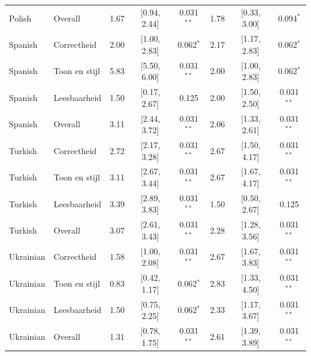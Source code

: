 \begin{table}[htbp]
\begin{tabular}{@{}l l c c c c c c@{}}
Polish & Overall & 1.67 & [0.94, 2.44] & 0.031$^{**}$ & 1.78 & [0.33, 3.00] & 0.094$^{*}$ \\
Spanish & Correctheid & 2.00 & [1.00, 2.83] & 0.062$^{*}$ & 2.17 & [1.17, 2.83] & 0.062$^{*}$ \\
Spanish & Toon en stijl & 5.83 & [5.50, 6.00] & 0.031$^{**}$ & 2.00 & [1.00, 2.83] & 0.062$^{*}$ \\
Spanish & Leesbaarheid & 1.50 & [0.17, 2.67] & 0.125 & 2.00 & [1.50, 2.50] & 0.031$^{**}$ \\
Spanish & Overall & 3.11 & [2.44, 3.72] & 0.031$^{**}$ & 2.06 & [1.33, 2.61] & 0.031$^{**}$ \\
Turkish & Correctheid & 2.72 & [2.17, 3.28] & 0.031$^{**}$ & 2.67 & [1.50, 4.17] & 0.031$^{**}$ \\
Turkish & Toon en stijl & 3.11 & [2.67, 3.44] & 0.031$^{**}$ & 2.67 & [1.67, 4.17] & 0.031$^{**}$ \\
Turkish & Leesbaarheid & 3.39 & [2.89, 3.83] & 0.031$^{**}$ & 1.50 & [0.50, 2.67] & 0.125 \\
Turkish & Overall & 3.07 & [2.61, 3.43] & 0.031$^{**}$ & 2.28 & [1.28, 3.56] & 0.031$^{**}$ \\
Ukrainian & Correctheid & 1.58 & [1.00, 2.08] & 0.031$^{**}$ & 2.67 & [1.67, 3.83] & 0.031$^{**}$ \\
Ukrainian & Toon en stijl & 0.83 & [0.42, 1.17] & 0.062$^{*}$ & 2.83 & [1.33, 4.50] & 0.031$^{**}$ \\
Ukrainian & Leesbaarheid & 1.50 & [0.75, 2.25] & 0.062$^{*}$ & 2.33 & [1.17, 3.67] & 0.031$^{**}$ \\
Ukrainian & Overall & 1.31 & [0.78, 1.75] & 0.031$^{**}$ & 2.61 & [1.39, 3.89] & 0.031$^{**}$ \\
\bottomrule
\end{tabular}
\end{table}
